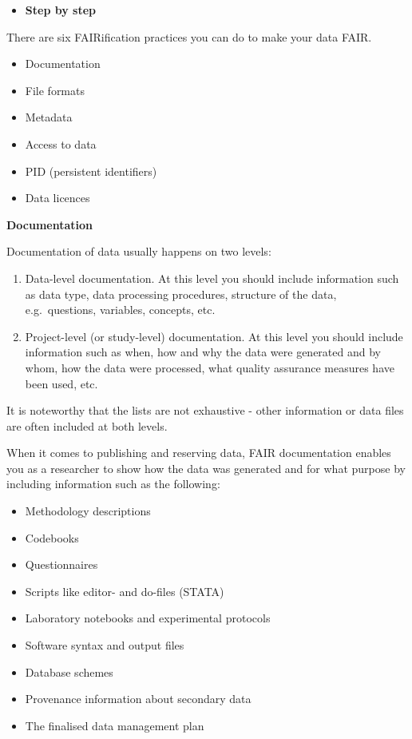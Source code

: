 \documentclass[
]{book}
\providecommand{\tightlist}{%
  \setlength{\itemsep}{0pt}\setlength{\parskip}{0pt}}
\begin{document}
\begin{itemize}
\tightlist
\item
  \textbf{Step by step}
\end{itemize}

There are six FAIRification practices you can do to make your data FAIR.

\begin{itemize}
\tightlist
\item
  Documentation
\item
  File formats
\item
  Metadata
\item
  Access to data
\item
  PID (persistent identifiers)
\item
  Data licences
\end{itemize}

\textbf{Documentation}

Documentation of data usually happens on two levels:

\begin{enumerate}
\def\labelenumi{\arabic{enumi}.}
\tightlist
\item
  Data-level documentation. At this level you should include information such as data type, data processing procedures, structure of the data, e.g.~questions, variables, concepts, etc.
\item
  Project-level (or study-level) documentation. At this level you should include information such as when, how and why the data were generated and by whom, how the data were processed, what quality assurance measures have been used, etc.
\end{enumerate}

It is noteworthy that the lists are not exhaustive - other information or data files are often included at both levels.

When it comes to publishing and reserving data, FAIR documentation enables you as a researcher to show how the data was generated and for what purpose by including information such as the following:

\begin{itemize}
\tightlist
\item
  Methodology descriptions
\item
  Codebooks
\item
  Questionnaires
\item
  Scripts like editor- and do-files (STATA)
\item
  Laboratory notebooks and experimental protocols
\item
  Software syntax and output files
\item
  Database schemes
\item
  Provenance information about secondary data
\item
  The finalised data management plan
\end{itemize}
\end{document}
